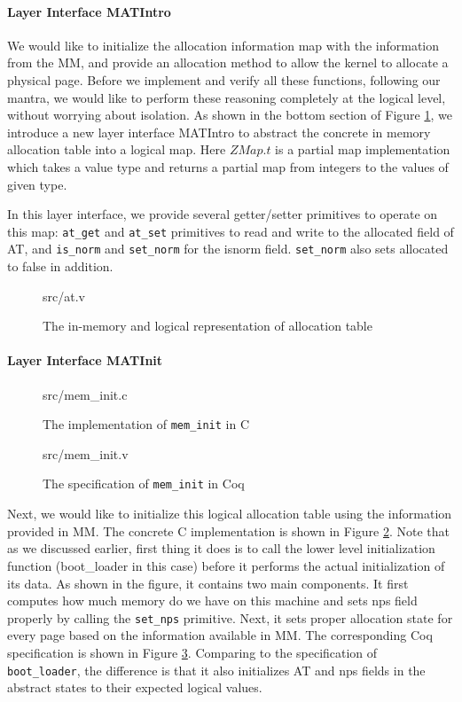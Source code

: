 \paragraph{Layer Interface MATIntro}
We would like to initialize the allocation information map with the information from the \textsf{MM},
and provide an allocation method to allow the kernel to allocate a physical page.
Before we implement and verify all these functions, following our mantra, we would like to perform
these reasoning completely at the logical level, without worrying about isolation.
As shown in the bottom section of Figure \ref{fig:at_v}, we introduce a new layer interface MATIntro
to abstract the concrete in memory allocation table into a logical map. Here $ZMap.t$ is a partial
map implementation which takes a value type and returns a partial map from integers to the values of given type.

In this layer interface, we provide several getter/setter primitives to operate on this map:
\texttt{at\_get} and \texttt{at\_set} primitives to read and write to the \textsf{allocated} field of \textsf{AT},
and \texttt{is\_norm} and \texttt{set\_norm} for the \textsf{isnorm} field. \texttt{set\_norm} also sets \textsf{allocated}
to \textsf{false} in addition.


\begin{figure}
	 {src/at.v}
	\caption{The in-memory and logical representation of allocation table}
	\label{fig:at_v}
\end{figure}

\paragraph{Layer Interface MATInit}

\begin{figure}
	 {src/mem_init.c}
	\caption{The implementation of \texttt{mem\_init} in C}
	\label{fig:mem_init_c}
\end{figure}


\begin{figure}
	 {src/mem_init.v}
	\caption{The specification of \texttt{mem\_init} in Coq}
	\label{fig:mem_init_v}
\end{figure}

Next, we would like to initialize this logical allocation table using the information provided
in \textsf{MM}. The concrete C implementation is shown in Figure \ref{fig:mem_init_c}.
Note that as we discussed earlier, first thing it does is to call the lower level initialization
function (boot\_loader in this case) before it performs the actual initialization of its data.
As shown in the figure, it contains two main components. It first computes how much memory
do we have on this machine and sets \textsf{nps} field properly by calling the \texttt{set\_nps} primitive.
Next, it sets proper allocation state for every page based on the information available in \textsf{MM}.
The corresponding Coq specification is shown in Figure \ref{fig:mem_init_v}. 
Comparing to the specification of \texttt{boot\_loader}, the difference is that it also initializes
\textsf{AT} and \textsf{nps} fields in the abstract states to their expected logical values.

